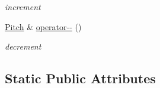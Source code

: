 \begin{DoxyCompactItemize}
\begin{DoxyCompactList}\small\item\em increment \end{DoxyCompactList}\item 
\hypertarget{classsinsy_1_1Pitch_a0f02a280b2bb88cc27a6aaa92ebc45fb}{\hyperlink{classsinsy_1_1Pitch}{\-Pitch} \& \hyperlink{classsinsy_1_1Pitch_a0f02a280b2bb88cc27a6aaa92ebc45fb}{operator-\/-\/} ()}\label{classsinsy_1_1Pitch_a0f02a280b2bb88cc27a6aaa92ebc45fb}

\begin{DoxyCompactList}\small\item\em decrement \end{DoxyCompactList}\end{DoxyCompactItemize}
\subsection*{\-Static \-Public \-Attributes}
